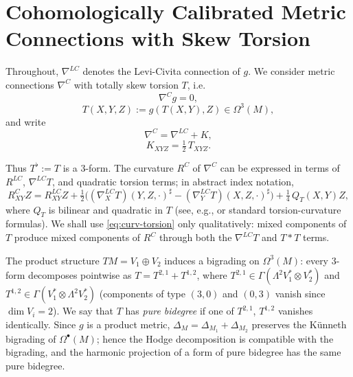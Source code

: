 \documentclass[11pt,reqno]{amsart}
\theoremstyle{plain}
\theoremstyle{definition}
\numberwithin{equation}{section}
\begin{document}
\section{Cohomologically Calibrated Metric Connections with Skew Torsion}

Throughout, \( \nabla^{LC} \) denotes the Levi-Civita connection of \(g\). We consider metric connections \( \nabla^C \) with totally skew torsion \(T\), i.e.
\begin{equation}
\nabla^C g=0,
\end{equation}
\begin{equation}
T(X,Y,Z):=g(T(X,Y),Z)\in\Omega^3(M),
\end{equation}
and write
\begin{equation}
\nabla^C=\nabla^{LC}+K,   
\end{equation}
\begin{equation}
K_{XYZ}=\tfrac12\,T_{XYZ}.
\end{equation}

Thus \(T^\flat:=T\) is a 3-form. The curvature \(R^C\) of \( \nabla^C \) can be expressed in terms of \(R^{LC}\), \(\nabla^{LC}T\), and quadratic torsion terms; in abstract index notation,
\begin{equation}\label{eq:curv-torsion}
R^C_{XY}Z
=
R^{LC}_{XY}Z
+ \tfrac12 \big( (\nabla^{LC}_X T)(Y,Z,\cdot)^\sharp - (\nabla^{LC}_Y T)(X,Z,\cdot)^\sharp \big)
+ \tfrac14\,Q_T(X,Y)Z,
\end{equation}
where \(Q_T\) is bilinear and quadratic in \(T\) (see, e.g., \cite{B (1987)} or standard torsion-curvature formulas). We shall use \eqref{eq:curv-torsion} only qualitatively: mixed components of \(T\) produce mixed components of \(R^C\) through both the \(\nabla^{LC}T\) and \(T\ast T\) terms.

The product structure $TM=V_1\oplus V_2$ induces a bigrading
on $\Omega^3(M)$: every $3$-form decomposes pointwise as
$T=T^{2,1}+T^{1,2}$, where
$T^{2,1}\in\Gamma(\Lambda^2V_1^*\otimes V_2^*)$ and
$T^{1,2}\in\Gamma(V_1^*\otimes\Lambda^2V_2^*)$
(components of type $(3,0)$ and $(0,3)$ vanish since $\dim V_i=2$). We say that $T$ has \emph{pure bidegree} if one of $T^{2,1}$, $T^{1,2}$ vanishes identically.
Since $g$ is a product metric, $\Delta_M=\Delta_{M_1}+\Delta_{M_2}$ preserves
the K\"unneth bigrading of $\Omega^{\bullet}(M)$; hence the Hodge decomposition is compatible with the bigrading, and the harmonic projection of a form of pure bidegree has the same pure bidegree.
\end{document}
